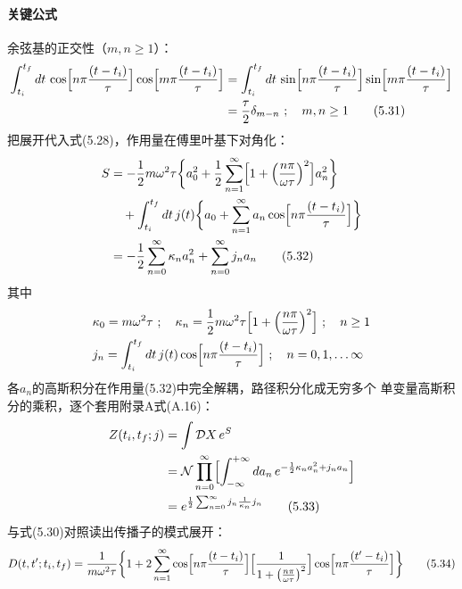 \paragraph{关键公式}
余弦基的正交性（$m,n\geq1$）：
\begin{align*}
\int_{t_{i}}^{t_{f}}dt\,\cos\Bigl[n\pi\frac{(t-t_{i})}{\tau}\Bigr]
\cos\Bigl[m\pi\frac{(t-t_{i})}{\tau}\Bigr]
&=\int_{t_{i}}^{t_{f}}dt\,\sin\Bigl[n\pi\frac{(t-t_{i})}{\tau}\Bigr]
\sin\Bigl[m\pi\frac{(t-t_{i})}{\tau}\Bigr]\\
&=\frac{\tau}{2}\delta_{m-n}\ ;\quad m,n\geq1
\tag{5.31}
\end{align*}
把展开代入式(5.28)，作用量在傅里叶基下对角化：
\begin{align*}
S&=-\frac{1}{2}m\omega^{2}\tau\biggl\{a_{0}^{2}
+\frac{1}{2}\sum_{n=1}^{\infty}
\Bigl[1+\Bigl(\frac{n\pi}{\omega\tau}\Bigr)^{2}\Bigr]a_{n}^{2}\biggr\}\\
&\quad+\int_{t_{i}}^{t_{f}}dt\,j(t)\biggl\{a_{0}
+\sum_{n=1}^{\infty}a_{n}\cos\Bigl[n\pi\frac{(t-t_{i})}{\tau}\Bigr]\biggr\}\\
&=-\frac{1}{2}\sum_{n=0}^{\infty}\kappa_{n}a_{n}^{2}
+\sum_{n=0}^{\infty}j_{n}a_{n}
\tag{5.32}
\end{align*}
其中
\begin{align*}
&\kappa_{0}=m\omega^{2}\tau\ ;\quad
\kappa_{n}=\frac{1}{2}m\omega^{2}\tau
\Bigl[1+\Bigl(\frac{n\pi}{\omega\tau}\Bigr)^{2}\Bigr]\ ;\quad n\geq1\\
&j_{n}=\int_{t_{i}}^{t_{f}}dt\,j(t)\cos\Bigl[n\pi\frac{(t-t_{i})}{\tau}\Bigr]\ ;
\quad n=0,1,\ldots\infty
\end{align*}
各$a_{n}$的高斯积分在作用量(5.32)中完全解耦，路径积分化成无穷多个
单变量高斯积分的乘积，逐个套用附录A式(A.16)：
\begin{align*}
Z(t_{i},t_{f};j)&=\int\mathcal{D}X\,e^{S}\\
&=\mathcal{N}\prod_{n=0}^{\infty}
\Bigl[\int_{-\infty}^{+\infty}da_{n}\,
e^{-\frac{1}{2}\kappa_{n}a_{n}^{2}+j_{n}a_{n}}\Bigr]\\
&=e^{\frac{1}{2}\sum_{n=0}^{\infty}j_{n}\frac{1}{\kappa_{n}}j_{n}}
\tag{5.33}
\end{align*}
与式(5.30)对照读出传播子的模式展开：
\begin{equation*}
D(t,t';t_{i},t_{f})=\frac{1}{m\omega^{2}\tau}\biggl\{1
+2\sum_{n=1}^{\infty}\cos\Bigl[n\pi\frac{(t-t_{i})}{\tau}\Bigr]
\Bigl[\frac{1}{1+\bigl(\frac{n\pi}{\omega\tau}\bigr)^{2}}\Bigr]
\cos\Bigl[n\pi\frac{(t'-t_{i})}{\tau}\Bigr]\biggr\}
\tag{5.34}
\end{equation*}
